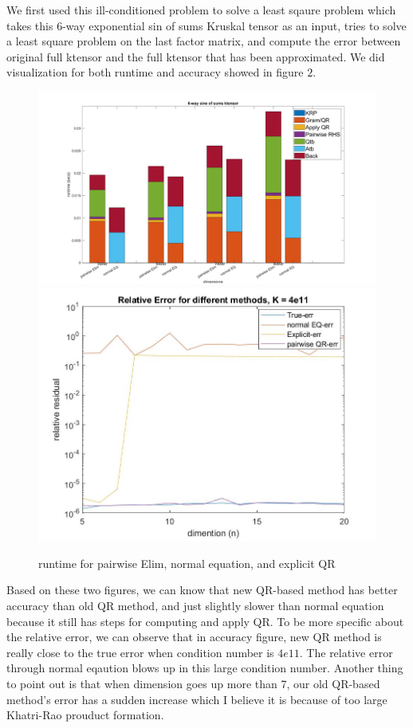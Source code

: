 \documentclass{article}
\begin{document}
We first used this ill-conditioned problem to solve a least sqaure problem which takes this 6-way exponential sin of sums Kruskal tensor as an input,
tries to solve a least square problem on the last factor matrix, and compute the error between original full ktensor 
and the full ktensor that has been approximated. We did visualization for both runtime and accuracy showed in figure $2$.

\begin{figure}[ht!]
  \begin{center}
    \includegraphics*[scale = 0.12]{6stacked.jpg}
    \includegraphics*[scale = 0.22]{6wayacc.jpg}
    \caption[Figure]{runtime for pairwise Elim, normal equation, and explicit QR}
  \end{center}
\end{figure}


Based on these two figures, we can know that new QR-based method has better accuracy than old QR method, and just slightly slower than 
normal equation because it still has steps for computing and apply QR. To be more specific about the relative error, we can observe
that in accuracy figure, new QR method is really close to the true error when condition number is $4e11$. The relative error through normal eqaution
blows up in this large condition number.
Another thing to point out is that when dimension goes up more than 7, our old QR-based method's error has a sudden increase which I believe 
it is because of too large Khatri-Rao prouduct formation.
\end{document}
